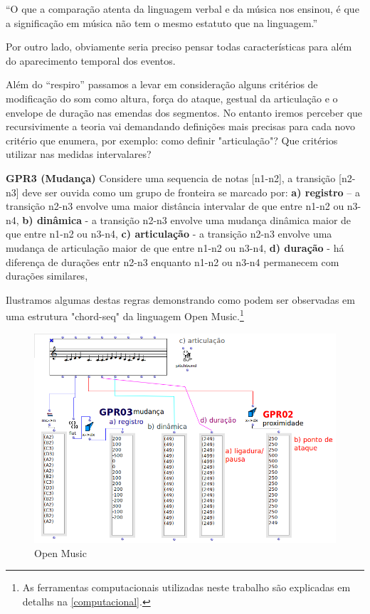 \documentclass[
	12pt,				%
	openright,			%
	twoside,			%
	a4paper,			%
	english,			%
	french,				%
	spanish,			%
	brazil				%
	]{abntex2}
\begin{document}
\begin{citacao}
“O que a comparação atenta da linguagem verbal e da música nos ensinou, é que a significação em música não tem o mesmo estatuto que na linguagem.”\cite[ p.9]{nattiez2004modelos}
\end{citacao}

Por outro lado, obviamente seria preciso pensar todas características para além do aparecimento temporal dos eventos.

Além do “respiro” passamos a levar em consideração alguns critérios de modificação do som como altura, força do ataque, gestual da articulação e o envelope de duração nas emendas dos segmentos. No entanto iremos perceber que recursivimente a teoria vai demandando definições mais precisas para cada novo critério que enumera, por exemplo: como definir "articulação"? Que critérios utilizar nas medidas intervalares?


\begin{citacao}
\textbf{GPR3 (Mudança)} Considere uma sequencia de notas [n1-n2], a transição [n2-n3] deve ser ouvida como um grupo de fronteira se marcado por: \textbf{a) registro} – a transição n2-n3 envolve uma maior distância intervalar de que entre n1-n2 ou n3-n4, \textbf{b) dinâmica} - a transição n2-n3 envolve uma mudança dinâmica maior de que entre n1-n2 ou n3-n4, \textbf{c) articulação} - a transição n2-n3 envolve uma mudança de articulação maior de que entre n1-n2 ou n3-n4, \textbf{d) duração} - há diferença de durações  entr n2-n3 enquanto n1-n2 ou n3-n4 permanecem com durações similares,
\cite{lerdahl1983generative}
\end{citacao}

\pagebreak
Ilustramos algumas destas regras demonstrando como podem ser observadas em uma estrutura "chord-seq" da linguagem Open Music.\footnote{As ferramentas computacionais utilizadas neste trabalho são explicadas em detalhs na \autoref{computacional}. }


\begin{figure}[htb]
	\caption{\label{fig_grafico}Open Music}
	\begin{center}
	    \includegraphics[scale=0.6]{mikro/OM_gttm_GPR02-03.png}
	\end{center}
\end{figure}
\end{document}
